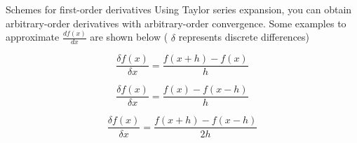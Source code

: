 \documentclass[presentation]{beamer}
\begin{document}
\begin{frame}[label={sec:orgb551822}]{Schemes for first-order derivatives}
Using Taylor series expansion, you can obtain arbitrary-order derivatives
with arbitrary-order convergence. Some examples to approximate \(\frac{df(x)}{dx}\) are shown below ( \(\delta\) represents discrete
differences)
\begin{example}
\[ \frac{\delta f(x)}{\delta x} = \frac{f(x+h) - f(x)}{h}\]
\end{example}
\begin{example}
\[ \frac{\delta f(x)}{\delta x} = \frac{f(x) - f(x-h)}{h}\]
\end{example}
\begin{example}
\[ \frac{\delta f(x)}{\delta x} = \frac{f(x+h) - f(x-h)}{2h}\]
\end{example}
\end{frame}
\end{document}
